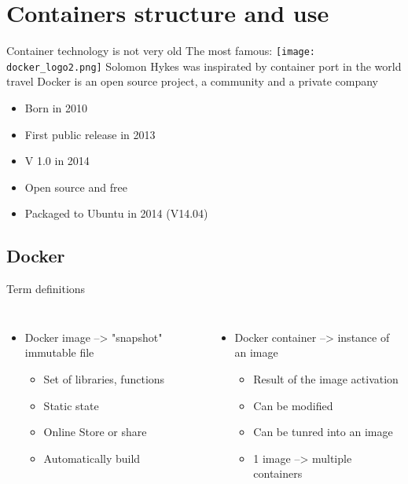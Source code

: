 \section{Containers structure and use}
\begin{frame}
Container technology is not very old \newline
\vspace{0.5cm}
The most famous: \texttt{[image: docker\_logo2.png]} \newline
\vspace{0.5cm}
Solomon Hykes was inspirated by container port in the world travel \newline
\vspace{0.5cm}
 \newline
Docker is an open source project, a community and a private company 
\end{frame}

\begin{frame}
\begin{itemize}
\item Born in 2010
\item First public release in 2013
\item V 1.0 in 2014
\item Open source and free
\item Packaged to Ubuntu in 2014 (V14.04)
\end{itemize}
\end{frame}

\subsection{Docker}{Term definitions}
\begin{frame}
\begin{columns}
\begin{itemize}[<1->]
\item Docker image --> "snapshot" immutable file
	\begin{itemize}
	\item Set of libraries, functions
	\item Static state
	\item Online Store or share
	\item Automatically build
	\end{itemize}
\end{itemize}
\begin{itemize}[<2->]
\item Docker container --> instance of an image
	\begin{itemize}
	\item Result of the image activation
	\item Can be modified
	\item Can be tunred into an image
	\item 1 image --> multiple containers 
	\end{itemize}
\end{itemize} 
\end{columns}
\end{frame}


